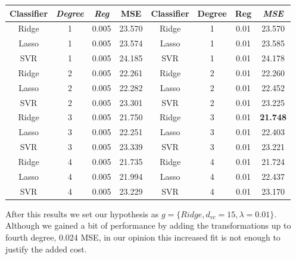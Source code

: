 \documentclass{article}
\begin{document}
\begin{table}[H]
\centering
\begin{tabular}{cccccccc}
Classifier & \textit{Degree} & \textit{Reg} & \multicolumn{1}{c|}{MSE} & Classifier & Degree & Reg  & \textit{MSE} \\ \hline
Ridge      & 1               & 0.005        & 23.570                   & Ridge      & 1      & 0.01 & 23.570       \\
Lasso      & 1               & 0.005        & 23.574                   & Lasso      & 1      & 0.01 & 23.585       \\
SVR        & 1               & 0.005        & 24.185                   & SVR        & 1      & 0.01 & 24.178       \\
Ridge      & 2               & 0.005        & 22.261                   & Ridge      & 2      & 0.01 & 22.260       \\
Lasso      & 2               & 0.005        & 22.282                   & Lasso      & 2      & 0.01 & 22.452       \\
SVR        & 2               & 0.005        & 23.301                   & SVR        & 2      & 0.01 & 23.225       \\
Ridge      & 3               & 0.005        & 21.750                   & Ridge      & 3      & 0.01 & \textbf{21.748}       \\
Lasso      & 3               & 0.005        & 22.251                   & Lasso      & 3      & 0.01 & 22.403       \\
SVR        & 3               & 0.005        & 23.339                   & SVR        & 3      & 0.01 & 23.221       \\
Ridge      & 4               & 0.005        & 21.735                   & Ridge      & 4      & 0.01 & 21.724       \\
Lasso      & 4               & 0.005        & 21.994                   & Lasso      & 4      & 0.01 & 22.437       \\
SVR        & 4               & 0.005        & 23.229                   & SVR        & 4      & 0.01 & 23.170      
\end{tabular}
\end{table}

After this results we set our hypothesis as $g=\{Ridge, d_{vc}=15, \lambda=0.01\}$. Although we gained a bit of performance by adding the transformations up to fourth degree, 0.024 MSE, in our opinion this increased fit is not enough to justify the added cost.
\end{document}
